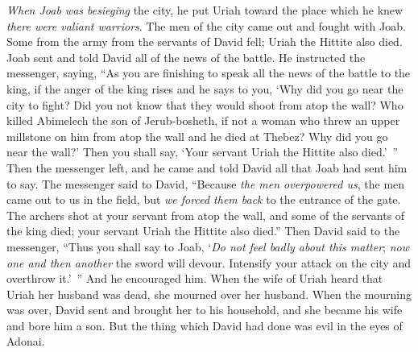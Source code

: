\begin{biblechapter}
\verse \textit{When Joab was besieging} the city, he put Uriah toward the place which he knew \textit{there were valiant warriors}.
\verse The men of the city came out and fought with Joab. Some from the army from the servants of David fell; Uriah the Hittite also died.
\verse Joab sent and told David all of the news of the battle.
\verse He instructed the messenger, saying, “As you are finishing to speak all the news of the battle to the king,
\verse if the anger of the king rises and he says to you, ‘Why did you go near the city to fight? Did you not know that they would shoot from atop the wall?
\verse Who killed Abimelech the son of Jerub-bosheth, if not a woman who threw an upper millstone on him from atop the wall and he died at Thebez? Why did you go near the wall?’ Then you shall say, ‘Your servant Uriah the Hittite also died.’ ”
\verse Then the messenger left, and he came and told David all that Joab had sent him to say.
\verse The messenger said to David, “Because \textit{the men overpowered us}, the men came out to us in the field, but \textit{we forced them back} to the entrance of the gate.
\verse The archers shot at your servant from atop the wall, and some of the servants of the king died; your servant Uriah the Hittite also died.”
\verse Then David said to the messenger, “Thus you shall say to Joab, ‘\textit{Do not feel badly about this matter}; \textit{now one and then another} the sword will devour. Intensify your attack on the city and overthrow it.’ ” And he encouraged him.
\verse When the wife of Uriah heard that Uriah her husband was dead, she mourned over her husband.
\verse When the mourning was over, David sent and brought her to his household, and she became his wife and bore him a son. But the thing which David had done was evil in the eyes of Adonai.
\end{biblechapter}

